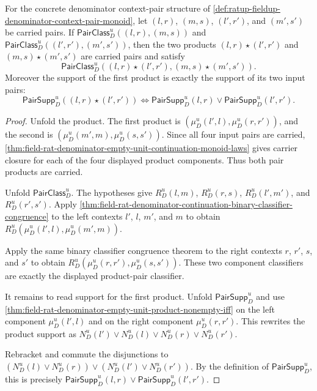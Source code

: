 \begin{theorem}
\label{thm:ratup-fieldup-denominator-context-pair-operation-stability}
For the concrete denominator context-pair structure of
\autoref{def:ratup-fieldup-denominator-context-pair-monoid}, let $(l,r)$,
$(m,s)$, $(l',r')$, and $(m',s')$ be carried pairs. If
$\mathsf{PairClass}_D^u((l,r),(m,s))$ and
$\mathsf{PairClass}_D^u((l',r'),(m',s'))$, then the two products
$(l,r)\star(l',r')$ and $(m,s)\star(m',s')$ are carried pairs and satisfy
$$
\mathsf{PairClass}_D^u((l,r)\star(l',r'),(m,s)\star(m',s')).
$$
Moreover the support of the first product is exactly the support of its two
input pairs:
$$
\mathsf{PairSupp}_D^u((l,r)\star(l',r'))
\Longleftrightarrow
\mathsf{PairSupp}_D^u(l,r)\lor\mathsf{PairSupp}_D^u(l',r').
$$
\end{theorem}
\begin{proof}
Unfold the product. The first product is
$(\mu_D^u(l',l),\mu_D^u(r,r'))$, and the second is
$(\mu_D^u(m',m),\mu_D^u(s,s'))$. Since all four input pairs are carried,
\autoref{thm:field-rat-denominator-empty-unit-continuation-monoid-laws}
gives carrier closure for each of the four displayed product components.
Thus both pair products are carried.

Unfold $\mathsf{PairClass}_D^u$. The hypotheses give
$R_D^u(l,m)$, $R_D^u(r,s)$, $R_D^u(l',m')$, and $R_D^u(r',s')$.
Apply
\autoref{thm:field-rat-denominator-continuation-binary-classifier-congruence}
to the left contexts $l'$, $l$, $m'$, and $m$ to obtain
$R_D^u(\mu_D^u(l',l),\mu_D^u(m',m))$.

Apply the same binary classifier congruence theorem to the right contexts $r$,
$r'$, $s$, and $s'$ to obtain
$R_D^u(\mu_D^u(r,r'),\mu_D^u(s,s'))$. These two component classifiers are
exactly the displayed product-pair classifier.

It remains to read support for the first product. Unfold
$\mathsf{PairSupp}_D^u$ and use
\autoref{thm:field-rat-denominator-empty-unit-product-nonempty-iff} on the
left component $\mu_D^u(l',l)$ and on the right component
$\mu_D^u(r,r')$. This rewrites the product support as
$N_D^u(l')\lor N_D^u(l)\lor N_D^u(r)\lor N_D^u(r')$.

Rebracket and commute the disjunctions to
$(N_D^u(l)\lor N_D^u(r))\lor(N_D^u(l')\lor N_D^u(r'))$. By the definition of
$\mathsf{PairSupp}_D^u$, this is precisely
$\mathsf{PairSupp}_D^u(l,r)\lor\mathsf{PairSupp}_D^u(l',r')$.
\end{proof}

